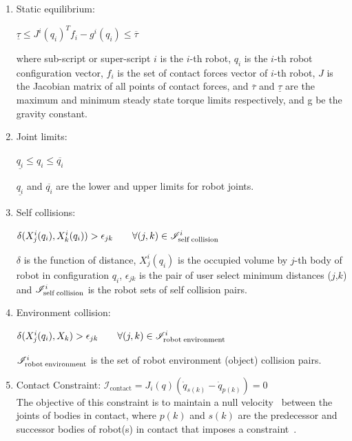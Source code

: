 \begin{enumerate}	
	\item Static equilibrium:

	$\underline{\tau} \leq J^i(q_i)^Tf_i - g^i(q_i) \leq \overline{\tau}$
	
	where sub-script or super-script $i$ is the $i$-th robot, $q_i$ is the $i$-th robot configuration vector, $f_i$ is the set of contact forces vector of $i$-th robot, $J$ is the Jacobian matrix of all points of contact forces, and $\overline{\tau}$ and $\underline{\tau}$ are the maximum and minimum steady state torque limits respectively, and g be the gravity constant.
	
	\item Joint limits:
	
	$\underline{q_i} \leq q_i \leq \overline{q_i}$
	
	$\underline{q_i}$ and $\overline{q_i}$ are the lower and upper limits for robot joints.
	
	\item Self collisions:
	
	$\delta(X^i_j(q_i), X^i_k(q_i)) > \epsilon_{jk} \qquad \forall(j,k)\in {\mathscr{I}}^i_{\text{self\;collision}}$
	
	$\delta$ is the function of distance, $X^i_j(q_i)$ is the occupied volume by $j$-th body of robot in configuration $q_i$, $\epsilon_{jk}$ is the pair of user select minimum distances ($j$,$k$) and ${\mathscr{I}}^i_{\text{self\;collision}}$ is the robot sets of self collision pairs.
	
	\item Environment collision:
	
	$\delta(X^i_j(q_i), X_k) > \epsilon_{jk} \qquad \forall(j,k)\in {\mathscr{I}}^i_{\text{robot\;environment}}$
	
	${\mathscr{I}}^i_{\text{robot\;environment}}$ is the set of robot environment (object) collision pairs.
	
	\item Contact Constraint: $\mathscr{I}_\text{contact} = J_i(q) (\dot{q}_{s(k)} - \dot{q}_{p(k)}) = 0$\\
	The objective of this constraint is to maintain a null velocity~\cite{ohwovoriole1980externsion} between the joints of bodies in contact, where $p(k)$ and $s(k)$ are the predecessor and successor bodies of robot(s) in contact that imposes a constraint~\cite{featherstone2014rigid}.
\end{enumerate}



